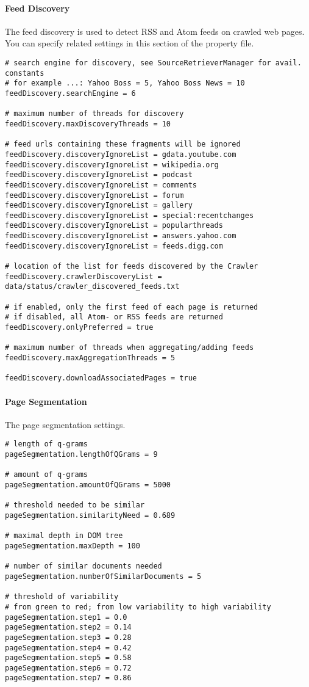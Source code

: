 \paragraph{Feed Discovery}
\label{par:feeddiscovery}
The feed discovery is used to detect RSS and Atom feeds on crawled web pages. You can specify related settings in this section of the property file.

\begin{verbatim}
# search engine for discovery, see SourceRetrieverManager for avail. constants
# for example ...: Yahoo Boss = 5, Yahoo Boss News = 10
feedDiscovery.searchEngine = 6

# maximum number of threads for discovery
feedDiscovery.maxDiscoveryThreads = 10

# feed urls containing these fragments will be ignored
feedDiscovery.discoveryIgnoreList = gdata.youtube.com
feedDiscovery.discoveryIgnoreList = wikipedia.org
feedDiscovery.discoveryIgnoreList = podcast
feedDiscovery.discoveryIgnoreList = comments
feedDiscovery.discoveryIgnoreList = forum
feedDiscovery.discoveryIgnoreList = gallery
feedDiscovery.discoveryIgnoreList = special:recentchanges
feedDiscovery.discoveryIgnoreList = popularthreads
feedDiscovery.discoveryIgnoreList = answers.yahoo.com
feedDiscovery.discoveryIgnoreList = feeds.digg.com

# location of the list for feeds discovered by the Crawler
feedDiscovery.crawlerDiscoveryList = data/status/crawler_discovered_feeds.txt

# if enabled, only the first feed of each page is returned
# if disabled, all Atom- or RSS feeds are returned
feedDiscovery.onlyPreferred = true

# maximum number of threads when aggregating/adding feeds
feedDiscovery.maxAggregationThreads = 5

feedDiscovery.downloadAssociatedPages = true
\end{verbatim}

\paragraph{Page Segmentation}
\label{par:pagesegmentation}
The page segmentation settings.

\begin{verbatim}
# length of q-grams
pageSegmentation.lengthOfQGrams = 9

# amount of q-grams
pageSegmentation.amountOfQGrams = 5000

# threshold needed to be similar
pageSegmentation.similarityNeed = 0.689

# maximal depth in DOM tree
pageSegmentation.maxDepth = 100

# number of similar documents needed
pageSegmentation.numberOfSimilarDocuments = 5

# threshold of variability
# from green to red; from low variability to high variability
pageSegmentation.step1 = 0.0
pageSegmentation.step2 = 0.14
pageSegmentation.step3 = 0.28
pageSegmentation.step4 = 0.42
pageSegmentation.step5 = 0.58
pageSegmentation.step6 = 0.72
pageSegmentation.step7 = 0.86
\end{verbatim}

